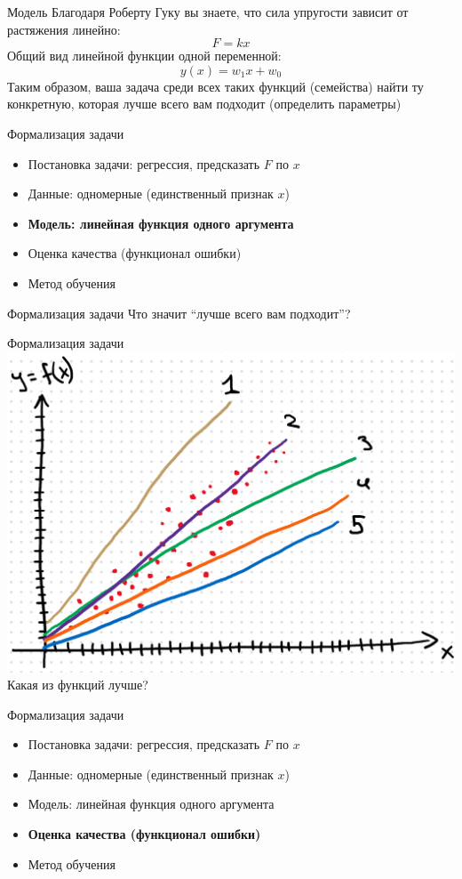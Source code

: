 \documentclass[aspectratio=169]{beamer}
\begin{document}
\begin{frame}{Модель}
    Благодаря Роберту Гуку вы знаете, что сила упругости зависит от растяжения линейно:
    {\LARGE \[ F = k x \]}
    \pause
    Общий вид линейной функции одной переменной:
    {\LARGE \[ y(x) = w_1 x + w_0 \]}
    \pause
    Таким образом, ваша задача среди всех таких функций (семейства) найти ту конкретную,
    которая лучше всего вам подходит (определить параметры)
\end{frame}

\begin{frame}{Формализация задачи}
    \begin{itemize}
        \item Постановка задачи: регрессия, предсказать \( F \) по \( x \)
        \item Данные: одномерные (единственный признак \( x \))
        \item \textbf{Модель: линейная функция одного аргумента}
        \item Оценка качества (функционал ошибки)
        \item Метод обучения
    \end{itemize}
\end{frame}

\begin{frame}{Формализация задачи}
    \centering
    {\Large Что значит ``лучше всего вам подходит''?}
\end{frame}

\begin{frame}{Формализация задачи}
    \centering
    \includegraphics[width=.54\linewidth]{figures/fig4.png} \\
    Какая из функций лучше?
\end{frame}

\begin{frame}{Формализация задачи}
    \begin{itemize}
        \item Постановка задачи: регрессия, предсказать \( F \) по \( x \)
        \item Данные: одномерные (единственный признак \( x \))
        \item Модель: линейная функция одного аргумента
        \item \textbf{Оценка качества (функционал ошибки)}
        \item Метод обучения
    \end{itemize}
\end{frame}
\end{document}
